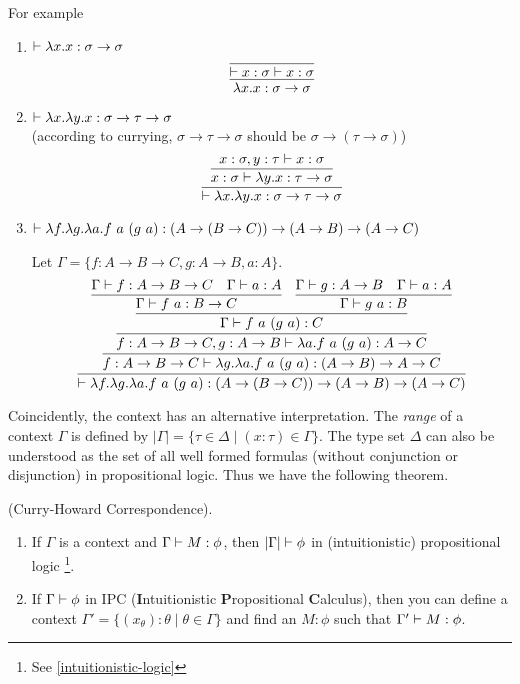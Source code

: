 For example
\begin{enumerate}
    \item $\vdash \lambda x.x: \sigma\to\sigma$
    $$
        \infer{
            \lambda x.x: \sigma\to\sigma
        }{\infer{\proves x:\sigma\proves x:\sigma}{}}
    $$
    \item $\vdash \lambda x.\lambda y.x: \sigma\to\tau\to\sigma$ \\
    (according to currying, $\sigma\to\tau\to\sigma$ should be 
    $\sigma\to(\tau\to\sigma)$)
    $$
        \infer{\proves \lambda x.\lambda y.x: \sigma\to\tau\to\sigma}{
            \infer{x:\sigma\proves\lambda y.x:\tau\to\sigma}{
                x:\sigma,y:\tau\proves x:\sigma
            }
        }
    $$
    \item $\vdash \lambda f.\lambda g.\lambda a. f\ a\ (g\ a):
    (A\to(B\to C))\to(A\to B)\to(A\to C)$

    Let $\Gamma=\{f:A\to B\to C,g:A\to B,a:A\}$.
    $$
        \infer{\proves \lambda f.\lambda g.\lambda a. f\ a\ (g\ a):
        (A\to(B\to C))\to(A\to B)\to(A\to C)}{
            \infer{
                f:A\to B\to C\proves\lambda g.\lambda a. f\ a\ (g\ a):(A\to B)\to A\to C
            }{
                \infer{
                    f:A\to B\to C, g: A\to B\proves\lambda a.f\ a\ (g\ a): A\to C
                }{
                    \infer{\Gamma\proves f\ a\ (g\ a): C}{
                        \infer{\Gamma\proves f\ a: B\to C}{
                            \Gamma\proves f:A\to B\to C 
                            &
                            \Gamma\proves a:A
                        }
                        &
                        \infer{\Gamma\proves g\ a: B}{
                            \Gamma\proves g:A\to B
                            &
                            \Gamma\proves a: A
                        }
                    }
                }
            }
        }
    $$
\end{enumerate}

Coincidently, the context has an alternative interpretation. The 
{\it range} of a context $\Gamma$ is defined by
$|\Gamma|=\{\tau\in\Delta\mid(x:\tau)\in\Gamma\}$. The type set $\Delta$
can also be understood as the set of all well formed formulas (without
conjunction or disjunction) in propositional logic. Thus we have the 
following theorem. 
\begin{theorem}
    (Curry-Howard Correspondence).
    \begin{enumerate}
        \item If $\Gamma$ is a context and $\Gamma\vdash M:\phi$, then
        $|\Gamma| \vdash \phi$ in (intuitionistic) propositional logic
        \footnote{See \autoref{intuitionistic-logic}}.
        \item If $\Gamma\vdash \phi$ in IPC 
        ({\bf I}ntuitionistic {\bf P}ropositional {\bf C}alculus), then
        you can define a context $\Gamma'=\{(x_\theta):\theta\mid\theta\in\Gamma\}$
        and find an $M: \phi$ such that $\Gamma'\vdash M:\phi$. 
    \end{enumerate}
\end{theorem}

